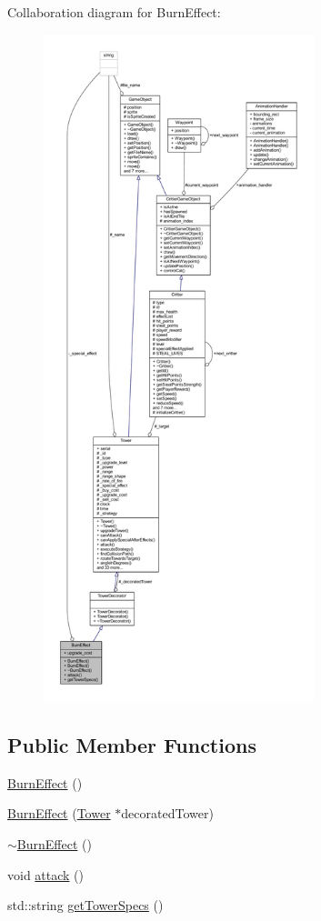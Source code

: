 Collaboration diagram for Burn\+Effect\+:
\nopagebreak
\begin{figure}[H]
\begin{center}
\leavevmode
\includegraphics[height=550pt]{class_burn_effect__coll__graph}
\end{center}
\end{figure}
\subsection*{Public Member Functions}
\begin{DoxyCompactItemize}
\item 
\hyperlink{class_burn_effect_ac51b659f222ccbc30cbb609ef177c887}{Burn\+Effect} ()
\item 
\hyperlink{class_burn_effect_a06df17552152fa567597e60ac9fc5a76}{Burn\+Effect} (\hyperlink{class_tower}{Tower} $\ast$decorated\+Tower)
\item 
\hyperlink{class_burn_effect_a79cc135ecc8309b406c0b3603ba7c3bb}{$\sim$\+Burn\+Effect} ()
\item 
void \hyperlink{class_burn_effect_a79e25ceec437f8beb196751e6cd37e2e}{attack} ()
\item 
std\+::string \hyperlink{class_burn_effect_a696db158260eaf01e3b497b6d400230e}{get\+Tower\+Specs} ()
\end{DoxyCompactItemize}
